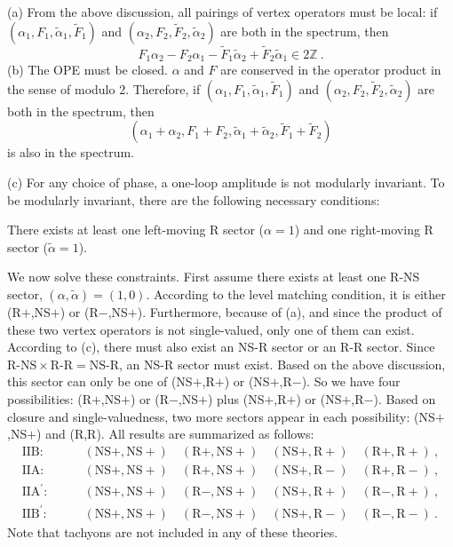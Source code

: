 	\noindent (a) From the above discussion, all pairings of vertex operators must be local: if $(\alpha_{1},F_{1},\tilde{\alpha}_{1},\tilde{F}_{1})$ and
	$(\alpha_{2},F_{2},\tilde{F}_{2},\tilde{\alpha}_{2})$ are both in the spectrum, then
	\begin{equation}
		F_{1}\alpha_{2} - F_{2}\alpha_{1} -\tilde{F}_{1}\tilde{\alpha}_{2} +\tilde{F}_{2}\tilde{\alpha}_{1}\in 2\mathds{Z}\:.\label{10.6.5}
	\end{equation}
	\noindent (b) The OPE must be closed. $\alpha$ and $F$ are conserved in the operator product in the sense of modulo 2. Therefore, if $(\alpha_{1},F_{1},\tilde{\alpha}_{1},\tilde{F}_{1})$ and
	$(\alpha_{2},F_{2},\tilde{F}_{2},\tilde{\alpha}_{2})$ are both in the spectrum, then
	\begin{equation}
		(\alpha_{1}+\alpha_{2},F_{1}+F_{2},\tilde{\alpha}_{1}+\tilde{\alpha}_{2},\tilde{F}_{1}+\tilde{F}_{2}) \label{10.6.6}
	\end{equation}
	is also in the spectrum.
	
	\noindent (c) For any choice of phase, a one-loop amplitude is not modularly invariant. To be modularly invariant, there are the following necessary conditions:
	
	\noindent \quad\: There exists at least one left-moving R sector ($\alpha=1$) and one right-moving R sector ($\tilde{\alpha}=1$).
	
	We now solve these constraints. First assume there exists at least one R-NS sector, $(\alpha,\tilde{\alpha})=(1,0)$. According to the level matching condition, it is either (R$+$,NS$+$) or (R$-$,NS$+$). Furthermore, because of (a), and since the product of these two vertex operators is not single-valued, only one of them can exist. According to (c), there must also exist an NS-R sector or an R-R sector. Since $\text{R-NS}\times \text{R-R}=\text{NS-R}$, an NS-R sector must exist. Based on the above discussion, this sector can only be one of (NS$+$,R$+$) or (NS$+$,R$-$). So we have four possibilities: (R$+$,NS$+$) or (R$-$,NS$+$) plus (NS$+$,R$+$) or (NS$+$,R$-$). Based on closure and single-valuedness, two more sectors appear in each possibility: (NS$+$,NS$+$) and (R,R). All results are summarized as follows:
	\begin{align*}
		\text{IIB}:&\qquad (\text{NS}+,\text{NS}+)\quad (\text{R}+,\text{NS}+)\quad (\text{NS}+,\text{R}+)\quad (\text{R}+,\text{R}+) \:, \\
		\text{IIA}:&\qquad (\text{NS}+,\text{NS}+)\quad (\text{R}+,\text{NS}+)\quad (\text{NS}+,\text{R}-)\quad (\text{R}+,\text{R}-) \:, \\
		\text{IIA}^{\prime}:&\qquad (\text{NS}+,\text{NS}+)\quad (\text{R}-,\text{NS}+)\quad (\text{NS}+,\text{R}+)\quad (\text{R}-,\text{R}+) \:, \\
		\text{IIB}^{\prime}:& \qquad (\text{NS}+,\text{NS}+)\quad (\text{R}-,\text{NS}+)\quad (\text{NS}+,\text{R}-)\quad (\text{R}-,\text{R}-) \:. 
	\end{align*}
	Note that tachyons are not included in any of these theories.
	
